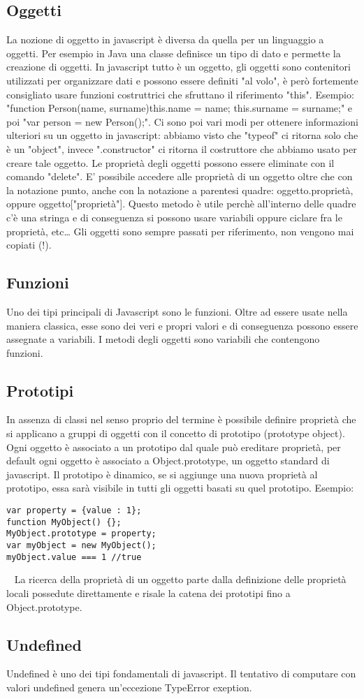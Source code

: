 \subsection{Oggetti}
La nozione di oggetto in javascript è diversa da quella per un linguaggio a oggetti. Per esempio in Java una classe definisce un tipo di dato e permette la creazione di oggetti. In javascript tutto è un oggetto, gli oggetti sono contenitori utilizzati per organizzare dati e possono essere definiti "al volo", è però fortemente consigliato usare funzioni costruttrici che sfruttano il riferimento "this". Esempio: "function Person(name, surname){this.name = name; this.surname = surname;}" e poi "var person = new Person();". Ci sono poi vari modi per ottenere informazioni ulteriori su un oggetto in javascript: abbiamo visto che "typeof" ci ritorna solo che è un "object", invece ".constructor" ci ritorna il costruttore che abbiamo usato per creare tale oggetto.\newline
\newline
Le proprietà degli oggetti possono essere eliminate con il comando "delete".\newline
\newline
E' possibile accedere alle proprietà di un oggetto oltre che con la notazione punto, anche con la notazione a parentesi quadre: oggetto.proprietà, oppure oggetto["proprietà"]. Questo metodo è utile perchè all'interno delle quadre c'è una stringa e di conseguenza si possono usare variabili oppure ciclare fra le proprietà, etc\dots \newline
\newline
Gli oggetti sono sempre passati per riferimento, non vengono mai copiati (!).
\subsection{Funzioni}
Uno dei tipi principali di Javascript sono le funzioni. Oltre ad essere usate nella maniera classica, esse sono dei veri e propri valori e di conseguenza possono essere assegnate a variabili. I metodi degli oggetti sono variabili che contengono funzioni.
\subsection{Prototipi}
In assenza di classi nel senso proprio del termine è possibile definire proprietà che si applicano a gruppi di oggetti con il concetto di prototipo (prototype object). Ogni oggetto è associato a un prototipo dal quale può ereditare proprietà, per default ogni oggetto è associato a Object.prototype, un oggetto standard di javascript. Il prototipo è dinamico, se si aggiunge una nuova proprietà al prototipo, essa sarà visibile in tutti gli oggetti basati su quel prototipo.\newline
Esempio:
\begin{lstlisting}
var property = {value : 1};
function MyObject() {};
MyObject.prototype = property;
var myObject = new MyObject();
myObject.value === 1 //true 
\end{lstlisting}
\ \newline
La ricerca della proprietà di un oggetto parte dalla definizione delle proprietà locali possedute direttamente e risale la catena dei prototipi fino a Object.prototype.
\subsection{Undefined}
Undefined è uno dei tipi fondamentali di javascript. Il tentativo di computare con valori undefined genera un'eccezione TypeError exeption.